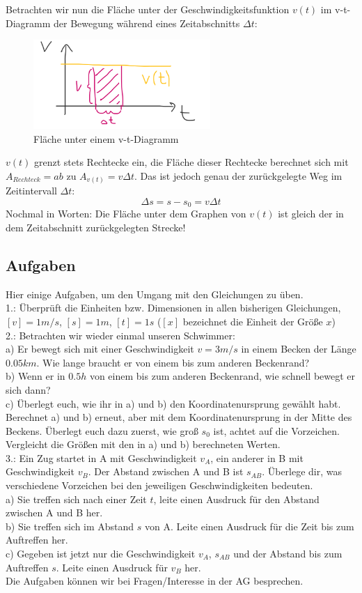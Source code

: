 \documentclass[11pt]{article}
\begin{document}
Betrachten wir nun die Fläche unter der Geschwindigkeitsfunktion $v(t)$ im v-t-Diagramm der Bewegung während eines Zeitabschnitts $\Delta t$: 
\begin{figure}[H] 
  \centering
     \includegraphics[width=0.6\textwidth]{v-t-diagramm-ggb-mit-flaeche.png}
     \caption{Fläche unter einem v-t-Diagramm}
\end{figure} 
$v(t)$ grenzt stets Rechtecke ein, die Fläche dieser Rechtecke berechnet sich mit $A_{Rechteck} = ab$ zu $A_{v(t)} = v\Delta t$. Das ist jedoch genau der zurückgelegte Weg im Zeitintervall $\Delta t$:
$$\Delta s = s - s_0 = v \Delta t$$
Nochmal in Worten: Die Fläche unter dem Graphen von $v(t)$ ist gleich der in dem Zeitabschnitt zurückgelegten Strecke!

\subsection*{Aufgaben}
Hier einige Aufgaben, um den Umgang mit den Gleichungen zu üben. \\

1.: Überprüft die Einheiten bzw. Dimensionen in allen bisherigen Gleichungen, $[v] = 1 m/s$, $[s] = 1 m$, $[t] = 1s$ ($[x]$ bezeichnet die Einheit der Größe $x$) \\

2.: Betrachten wir wieder einmal unseren Schwimmer: \\
a) Er bewegt sich mit einer Geschwindigkeit $v = 3 m/s$ in einem Becken der Länge $0.05km$. Wie lange braucht er von einem bis zum anderen Beckenrand? \\
b) Wenn er in $0.5h$ von einem bis zum anderen Beckenrand, wie schnell bewegt er sich dann? \\
c) Überlegt euch, wie ihr in a) und b) den Koordinatenursprung gewählt habt. Berechnet a) und b) erneut, aber mit dem Koordinatenursprung in der Mitte des Beckens. Überlegt euch dazu zuerst, wie groß $s_0$ ist, achtet auf die Vorzeichen. Vergleicht die Größen mit den in a) und b) berechneten Werten. \\

3.: Ein Zug startet in A mit Geschwindigkeit $v_A$, ein anderer in B mit Geschwindigkeit $v_B$. Der Abstand zwischen A und B ist $s_{AB}$. Überlege dir, was verschiedene Vorzeichen bei den jeweiligen Geschwindigkeiten bedeuten. \\ 
a) Sie treffen sich nach einer Zeit $t$, leite einen Ausdruck für den Abstand zwischen A und B her. \\
b) Sie treffen sich im Abstand $s$ von A. Leite einen Ausdruck für die Zeit bis zum Auftreffen her. \\
c) Gegeben ist jetzt nur die Geschwindigkeit $v_A$, $s_{AB}$ und der Abstand bis zum Auftreffen $s$. Leite einen Ausdruck für $v_B$ her. \\

Die Aufgaben können wir bei Fragen/Interesse in der AG besprechen. 
\end{document}
